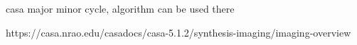 casa major minor cycle, algorithm can be used there

https://casa.nrao.edu/casadocs/casa-5.1.2/synthesis-imaging/imaging-overview